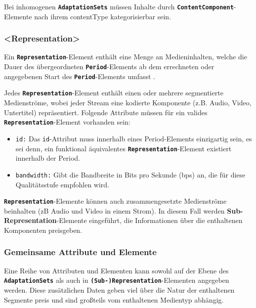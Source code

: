 \documentclass[paper = a4, fontsize = 12pt, parskip = half]{scrartcl} %
\def\attr#1{\texttt{#1}}
\def\elem#1{\texttt{\textbf{#1}}}
\begin{document}
Bei inhomogenen \elem{AdaptationSets} müssen Inhalte durch \elem{ContentComponent}-Elemente nach ihrem contentType kategorisierbar sein.

\subsubsection{<Representation>}
Ein \elem{Representation}-Element enthält eine Menge an Medieninhalten, welche die Dauer des übergeordneten \elem{Period}-Elements ab dem errechneten oder angegebenen Start des \elem{Period}-Elements umfasst \cite{international_organization_for_standardization_isoiec_nodate}.

Jedes \elem{Representation}-Element enthält einen oder mehrere segmentierte Medienströme, wobei jeder Stream eine kodierte Komponente (z.B. Audio, Video, Untertitel) repräsentiert. Folgende Attribute müssen für ein valides \elem{Representation}-Element vorhanden sein:

\begin{itemize}
	\item \attr{id:} Das \attr{id}-Attribut muss innerhalb eines Period-Elements einzigartig sein, es sei denn, ein funktional äquivalentes \elem{Representation}-Element existiert innerhalb der Period.
	\item \attr{bandwidth:} Gibt die Bandbreite in Bits pro Sekunde (bps) an, die für diese Qualitätsstufe empfohlen wird.
\end{itemize}

\elem{Representation}-Elemente können auch zusammengesetzte Medienströme beinhalten (zB Audio und Video in einem Strom). In diesem Fall werden \textbf{Sub-Representation}-Elemente eingeführt, die Informationen über die enthaltenen Komponenten preisgeben.

\subsubsection{Gemeinsame Attribute und Elemente}
Eine Reihe von Attributen und Elementen kann sowohl auf der Ebene des \elem{AdaptationSets} als auch in \elem{(Sub-)Representation}-Elementen angegeben werden. Diese zusätzlichen Daten geben viel über die Natur der enthaltenen Segmente preis und sind großteils vom enthaltenen Medientyp abhängig.
\end{document}
